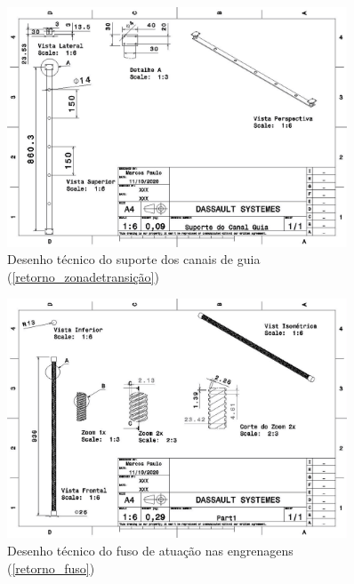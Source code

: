 \begin{apendicesenv}
\begin{figure}[H]
    \centering
    \includegraphics[width=0.9\textwidth]{figuras/estrutura/Desenhos/Suporte_CanaldeGuia.jpg}
    \caption{Desenho técnico do suporte dos canais de guia (\ref{retorno_zonadetransição})}
    \label{fig:supp_canal}
\end{figure}

\begin{figure}[H]
    \centering
    \includegraphics[width=0.9\textwidth]{figuras/estrutura/Desenhos/Fuso_Engrenagens.jpg}
    \caption{Desenho técnico do fuso de atuação nas engrenagens (\ref{retorno_fuso})}
    \label{fig:fuso}
\end{figure}


\end{apendicesenv}
